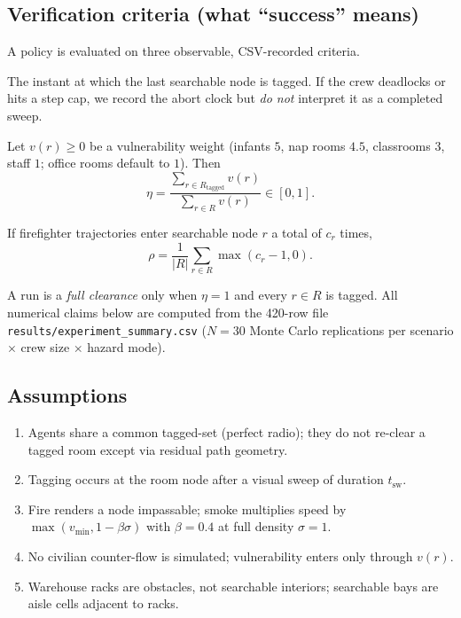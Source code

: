 \documentclass[12pt]{article}
\newcommand{\Tclear}{T_{\mathrm{clear}}}
\newcommand{\tsw}{t_{\mathrm{sw}}}
\begin{document}
\subsection{Verification criteria (what ``success'' means)}

A policy is evaluated on three observable, CSV-recorded criteria.
\begin{description}[style=nextline,leftmargin=1.1em]
  \item[Total sweep time \(\Tclear\).]
    The instant at which the last searchable node is tagged. If the crew deadlocks or
    hits a step cap, we record the abort clock but \emph{do not} interpret it as a
    completed sweep.
  \item[Vulnerable-population salvage \(\eta\).]
    Let \(v(r)\ge 0\) be a vulnerability weight (infants \(5\), nap rooms \(4.5\),
    classrooms \(3\), staff \(1\); office rooms default to \(1\)). Then
    \begin{equation}
      \label{eq:eta}
      \eta
      = \frac{\sum_{r\in R_{\mathrm{tagged}}} v(r)}{\sum_{r\in R} v(r)}
      \in [0,1].
    \end{equation}
  \item[Redundancy rate \(\rho\).]
    If firefighter trajectories enter searchable node \(r\) a total of \(c_r\) times,
    \begin{equation}
      \label{eq:rho}
      \rho
      = \frac{1}{|R|}\sum_{r\in R}\max(c_r-1,0).
    \end{equation}
\end{description}
A run is a \emph{full clearance} only when \(\eta=1\) and every \(r\in R\) is tagged.
All numerical claims below are computed from the 420-row file
\texttt{results/experiment\_summary.csv} (\(N=30\) Monte Carlo replications per
scenario \(\times\) crew size \(\times\) hazard mode).

\subsection{Assumptions}
\begin{enumerate}[leftmargin=1.4em]
  \item Agents share a common tagged-set (perfect radio); they do not re-clear a tagged
        room except via residual path geometry.
  \item Tagging occurs at the room node after a visual sweep of duration \(\tsw\).
  \item Fire renders a node impassable; smoke multiplies speed by
        \(\max(v_{\min},1-\beta\sigma)\) with \(\beta=0.4\) at full density \(\sigma=1\).
  \item No civilian counter-flow is simulated; vulnerability enters only through \(v(r)\).
  \item Warehouse racks are obstacles, not searchable interiors; searchable bays are
        aisle cells adjacent to racks.
\end{enumerate}
\end{document}
